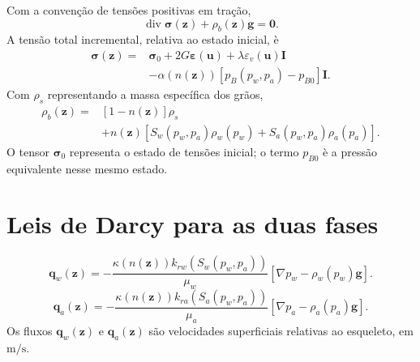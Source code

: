 \documentclass[11pt,a4paper]{article}
\newcommand{\Div}{\operatorname{div}}
\newcommand{\Id}{\mathbf I}
\begin{document}
Com a conven\c{c}\~ao de tens\~oes positivas em tra\c{c}\~ao,
\begin{equation*}
\boxed{\Div\boldsymbol\sigma(\mathbf z)+\rho_b(\mathbf z)\mathbf g=\mathbf0.}
\end{equation*}
A tens\~ao total incremental, relativa ao estado inicial, \`e
\begin{equation*}
\boxed{\begin{aligned}
\boldsymbol\sigma(\mathbf z)={}&\boldsymbol\sigma_0
+2G\boldsymbol\varepsilon(\mathbf u)
+\lambda\varepsilon_v(\mathbf u)\Id\\
&-\alpha(n(\mathbf z))
\left[p_B(p_w,p_a)-p_{B0}\right]\Id.
\end{aligned}}
\end{equation*}
Com $\rho_s$ representando a massa espec\'ifica dos gr\~aos,
\begin{equation*}
\boxed{\begin{aligned}
\rho_b(\mathbf z)={}&[1-n(\mathbf z)]\rho_s\\
&+n(\mathbf z)\left[
S_w(p_w,p_a)\rho_w(p_w)+S_a(p_w,p_a)\rho_a(p_a)
\right].
\end{aligned}}
\end{equation*}
O tensor $\boldsymbol\sigma_0$ representa o estado de tens\~oes inicial;
o termo $p_{B0}$ \`e a press\~ao equivalente nesse mesmo estado.

\section{Leis de Darcy para as duas fases}

\begin{equation*}
\boxed{\mathbf q_w(\mathbf z)=
-\frac{\kappa(n(\mathbf z))k_{rw}(S_w(p_w,p_a))}{\mu_w}
\left[\nabla p_w-\rho_w(p_w)\mathbf g\right].}
\end{equation*}
\begin{equation*}
\boxed{\mathbf q_a(\mathbf z)=
-\frac{\kappa(n(\mathbf z))k_{ra}(S_a(p_w,p_a))}{\mu_a}
\left[\nabla p_a-\rho_a(p_a)\mathbf g\right].}
\end{equation*}
Os fluxos $\mathbf q_w(\mathbf z)$ e $\mathbf q_a(\mathbf z)$ s\~ao
velocidades superficiais relativas ao esqueleto, em $\mathrm{m/s}$.
\end{document}
